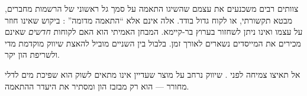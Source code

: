 צוותים רבים משכנעים את עצמם שהשיגו התאמה על סמך גל ראשוני של הרשמות מחברים,
מבטא תקשורתי, או לקוח גדול בודד. אלה אינם  אלא ``התאמה מדומה''
: ביקוש שאינו חוזר על עצמו ואינו ניתן לשחזור בערוץ בר-קיימא.
המבחן האמיתי הוא האם לקוחות \emph{חדשים} שאינם מכירים את המייסדים נשארים
לאורך זמן. בלבול בין השניים מוביל להאצת שיווק מוקדמת מדי ולשריפת הון יקר.

\begin{takeaway}
אל תאיצו צמיחה לפני . שיווק נרחב על מוצר שעדיין אינו מתאים לשוק הוא
שפיכת מים לדלי מחורר — הוא רק מבזבז הון ומסתיר את היעדר ההתאמה.
\end{takeaway}
